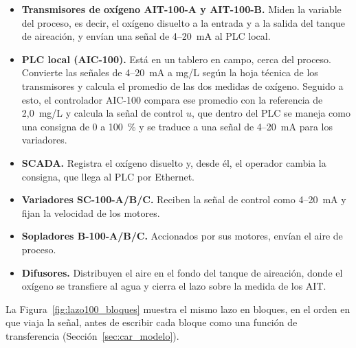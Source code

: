 \begin{itemize}
  \item \textbf{Transmisores de oxígeno AIT-100-A y AIT-100-B.} Miden la
  variable del proceso, es decir, el oxígeno disuelto a la entrada y a la
  salida del tanque de aireación, y envían una señal de 4--20~mA al PLC local.

  \item \textbf{PLC local (AIC-100).} Está en un tablero en campo, cerca del proceso.
  Convierte las señales de 4--20~mA a mg/L según la hoja técnica de los
  transmisores y calcula el promedio de las dos medidas de oxígeno. Seguido a
  esto, el controlador AIC-100 compara ese promedio con la referencia de 2,0~mg/L y
  calcula la señal de control $u$, que dentro del PLC se maneja como una
  consigna de 0 a 100~\% y se traduce a una señal de 4--20~mA para los
  variadores.

  \item \textbf{SCADA.} Registra el oxígeno disuelto y, desde él, el
  operador cambia la consigna, que llega al PLC por Ethernet.

  \item \textbf{Variadores SC-100-A/B/C.} Reciben la señal de control como
  4--20~mA y fijan la velocidad de los motores.

  \item \textbf{Sopladores B-100-A/B/C.} Accionados por sus motores, envían
  el aire de proceso.

  \item \textbf{Difusores.} Distribuyen el aire en el fondo del tanque de
  aireación, donde el oxígeno se transfiere al agua y cierra el lazo sobre la
  medida de los AIT.
\end{itemize}

La Figura~\ref{fig:lazo100_bloques} muestra el mismo lazo en bloques, en el orden en que
viaja la señal, antes de escribir cada bloque como una función de transferencia (Sección~\ref{sec:car_modelo}).

